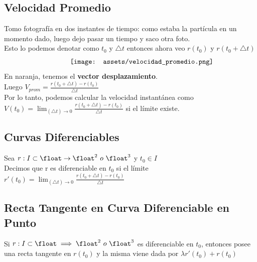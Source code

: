 \documentclass[10pt,a4paper]{article}
\begin{document}
\subsection*{Velocidad Promedio}
Tomo fotografía en dos instantes de tiempo: como estaba la partícula en un momento dado, luego dejo pasar un tiempo y saco otra foto. \\
Esto lo podemos denotar como $t_{0}$ y $\triangle t$ entonces ahora veo $r(t_{0})$ y $r(t_{0} + \triangle t)$
\[\begin{minipage}[b]{0.5\textwidth}
    \texttt{[image: assets/velocidad\_promedio.png]}
\end{minipage}\]
En naranja, tenemos el \textbf{vector desplazamiento}. \\
Luego $V_{prom} = \frac{r(t_{0} + \triangle t) - r(t_{0})}{\triangle t}$ \\
Por lo tanto, podemos calcular la velocidad instantánea como $V(t_{0}) =  \lim_{(\triangle t) \to 0} \frac{r(t_{0} + \triangle t) - r(t_{0})}{\triangle t} $ si el límite existe.
\subsection*{Curvas Diferenciables}
Sea $r: I \subset \float \rightarrow \float^{2} \ o \ \float^{3}$ y $t_{0} \in I$ \\
Decimos que r es diferenciable en $t_{0}$ si el límite $r'(t_{0}) = \lim_{(\triangle t) \to 0} \frac{r(t_{0} + \triangle t) - r(t_{0})}{\triangle t}$ 
\subsection*{Recta Tangente en Curva Diferenciable en Punto}
\label{subsec:recta_tangente_curva}
Si $r:I \subset \float \implies \float^{2} \ o \ \float^{3}$ es diferenciable en $t_{0}$, entonces posee una recta tangente en $r(t_{0})$ y la misma viene dada por $ \lambda r'(t_{0}) + r(t_{0})$ \\
\end{document}
